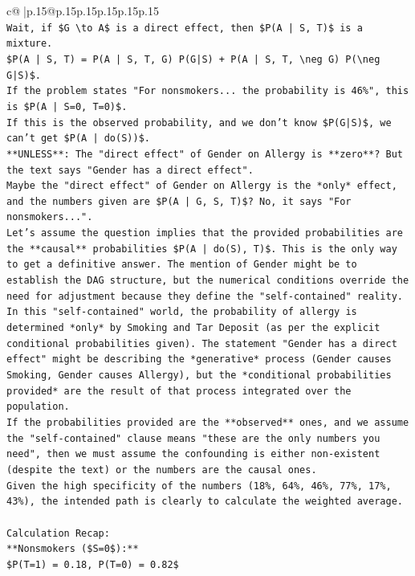 \documentclass{article}
\begin{document}
{\begin{supertabular}{c@{$\;$}|p{.15\linewidth}@{}p{.15\linewidth}p{.15\linewidth}p{.15\linewidth}p{.15\linewidth}p{.15\linewidth}}
{{{\\ 
\texttt{Wait, if \$G \textbackslash{}to A\$ is a direct effect, then \$P(A | S, T)\$ is a mixture.} \\
\texttt{\$P(A | S, T) = P(A | S, T, G) P(G|S) + P(A | S, T, \textbackslash{}neg G) P(\textbackslash{}neg G|S)\$.} \\
\texttt{If the problem states "For nonsmokers... the probability is 46\%", this is \$P(A | S=0, T=0)\$.} \\
\texttt{If this is the observed probability, and we don't know \$P(G|S)\$, we can't get \$P(A | do(S))\$.} \\
\texttt{**UNLESS**: The "direct effect" of Gender on Allergy is **zero**? But the text says "Gender has a direct effect".} \\
\texttt{Maybe the "direct effect" of Gender on Allergy is the *only* effect, and the numbers given are \$P(A | G, S, T)\$? No, it says "For nonsmokers...".} \\
\texttt{Let's assume the question implies that the provided probabilities are the **causal** probabilities \$P(A | do(S), T)\$. This is the only way to get a definitive answer. The mention of Gender might be to establish the DAG structure, but the numerical conditions override the need for adjustment because they define the "self{-}contained" reality.} \\
\texttt{In this "self{-}contained" world, the probability of allergy is determined *only* by Smoking and Tar Deposit (as per the explicit conditional probabilities given). The statement "Gender has a direct effect" might be describing the *generative* process (Gender causes Smoking, Gender causes Allergy), but the *conditional probabilities provided* are the result of that process integrated over the population.} \\
\texttt{If the probabilities provided are the **observed** ones, and we assume the "self{-}contained" clause means "these are the only numbers you need", then we must assume the confounding is either non{-}existent (despite the text) or the numbers are the causal ones.} \\
\texttt{Given the high specificity of the numbers (18\%, 64\%, 46\%, 77\%, 17\%, 43\%), the intended path is clearly to calculate the weighted average.} \\
\\ 
\texttt{Calculation Recap:} \\
\texttt{**Nonsmokers (\$S=0\$):**} \\
\texttt{\$P(T=1) = 0.18, P(T=0) = 0.82\$} \\
}}}
\end{supertabular}}
\end{document}
